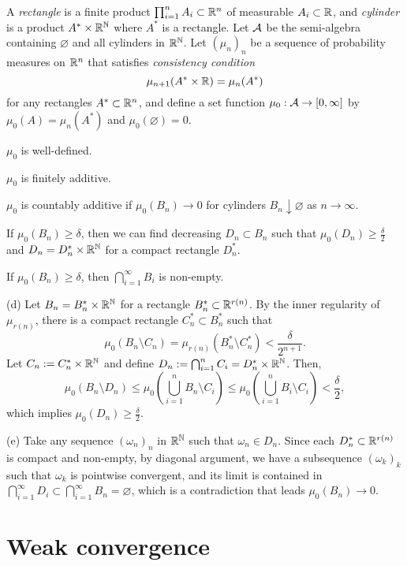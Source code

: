 \documentclass{../note}
\begin{document}
\begin{prb}
A \emph{rectangle} is a finite product $\prod_{i=1}^nA_i\subset\mathbb{R}^n$ of measurable $A_i\subset\mathbb{R}$, and \emph{cylinder} is a product $A^*\times\mathbb{R}^{\mathbb{N}}$ where $A^*$ is a rectangle.
Let $\mathcal{A}$ be the semi-algebra containing $\varnothing$ and all cylinders in $\mathbb{R}^{\mathbb{N}}$.
Let $(\mu_n)_n$ be a sequence of probability measures on $\mathbb{R}^n$ that satisfies \emph{consistency condition}
\[\mu_{n+1}(A^*\times\mathbb{R})=\mu_n(A^*)\]
for any rectangles $A^*\subset\mathbb{R}^n$, and define a set function $\mu_0:\mathcal{A}\to[0,\infty]$ by $\mu_0(A)=\mu_n(A^*)$ and $\mu_0(\varnothing)=0$.
\begin{parts}
\item $\mu_0$ is well-defined.
\item $\mu_0$ is finitely additive.
\item $\mu_0$ is countably additive if $\mu_0(B_n)\to0$ for cylinders $B_n\downarrow\varnothing$ as $n\to\infty$.
\item If $\mu_0(B_n)\ge\delta$, then we can find decreasing $D_n\subset B_n$ such that $\mu_0(D_n)\ge\frac\delta2$ and $D_n=D_n^*\times\mathbb{R}^{\mathbb{N}}$ for a compact rectangle $D_n^*$.
\item If $\mu_0(B_n)\ge\delta$, then $\bigcap_{i=1}^\infty B_i$ is non-empty.
\end{parts}
\end{prb}
\begin{pf}
(d)
Let $B_n=B_n^*\times\mathbb{R}^{\mathbb{N}}$ for a rectangle $B_n^*\subset\mathbb{R}^{r(n)}$.
By the inner regularity of $\mu_{r(n)}$, there is a compact rectangle $C_n^*\subset B_n^*$ such that
\[\mu_0(B_n\setminus C_n)=\mu_{r(n)}(B_n^*\setminus C_n^*)<\frac\delta{2^{n+1}}.\]
Let $C_n:=C_n^*\times\mathbb{R}^{\mathbb{N}}$ and define $D_n:=\bigcap_{i=1}^nC_i=D_n^*\times\mathbb{R}^{\mathbb{N}}$.
Then,
\[\mu_0(B_n\setminus D_n)\le\mu_0(\bigcup_{i=1}^nB_n\setminus C_i)\le\mu_0(\bigcup_{i=1}^nB_i\setminus C_i)<\frac\delta2,\]
which implies $\mu_0(D_n)\ge\frac\delta2$.

(e)
Take any sequence $(\omega_n)_n$ in $\mathbb{R}^{\mathbb{N}}$ such that $\omega_n\in D_n$.
Since each $D_n^*\subset\mathbb{R}^{r(n)}$ is compact and non-empty, by diagonal argument, we have a subsequence $(\omega_k)_k$ such that $\omega_k$ is pointwise convergent, and its limit is contained in $\bigcap_{i=1}^\infty D_i\subset\bigcap_{i=1}^\infty B_n=\varnothing$, which is a contradiction that leads $\mu_0(B_n)\to0$.
\end{pf}

\section{Weak convergence}
\end{document}
